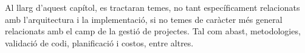 Al llarg d'aquest capítol, es tractaran temes, no tant específicament relacionats amb l'arquitectura i la implementació, si no temes de caràcter més general relacionats amb el camp de la gestió de projectes. Tal com abast, metodologies, validació de codi, planificació i costos, entre altres.


\clearpage

\clearpage

\clearpage

\clearpage
%

\clearpage

\clearpage

\clearpage
%

\clearpage
